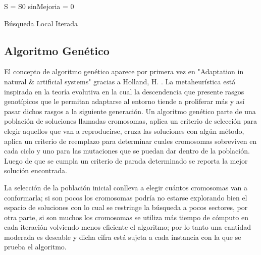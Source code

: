\documentclass{ci5652}
\begin{document}
\begin{algorithm}
 \label{alg4}
 \DontPrintSemicolon
 \vspace*{0.1cm}
 S = S0 
 sinMejoria = 0 \;

 \vspace*{0.1cm}
 \caption{Búsqueda Local Iterada}
\end{algorithm}

\subsection{Algoritmo Genético}

El concepto de algoritmo genético aparece por primera vez en "Adaptation in natural \& artificial systems" gracias a Holland, H. \cite{10}. La metaheurística está inspirada en la teoría evolutiva en la cual la descendencia que presente rasgos genotípicos que le permitan adaptarse al entorno tiende a proliferar más y así pasar dichos rasgos a la siguiente generación. Un algoritmo genético parte de una población de soluciones llamadas cromosomas, aplica un criterio de selección para elegir aquellos que van a reproducirse, cruza las soluciones con algún método, aplica un criterio de reemplazo para determinar cuales cromosomas sobreviven en cada ciclo y uno para las mutaciones que se puedan dar dentro de la población. Luego de que se cumpla un criterio de parada determinado se reporta la mejor solución encontrada.

La selección de la población inicial conlleva a elegir cuántos cromosomas van a conformarla; si son pocos los cromosomas podría no estarse explorando bien el espacio de soluciones con lo cual se restringe la búsqueda a pocos sectores, por otra parte, si son muchos los cromosomas se utiliza más tiempo de cómputo en cada iteración volviendo menos eficiente el algoritmo; por lo tanto una cantidad moderada es deseable y dicha cifra está sujeta a cada instancia con la que se prueba el algoritmo. 
\end{document}
